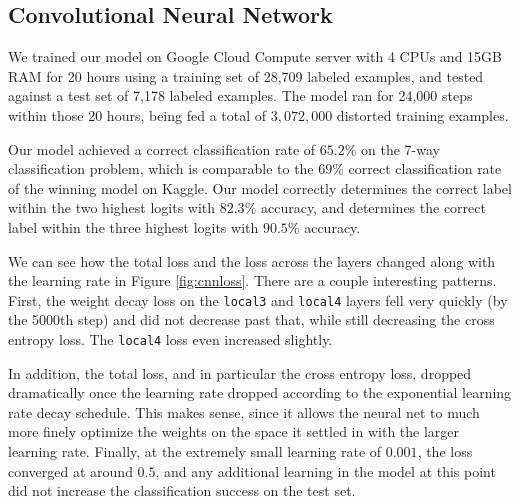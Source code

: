 \documentclass[11pt, twocolumn, twoside]{article}
\begin{document}
\subsection{Convolutional Neural Network}

We trained our model on Google Cloud Compute server with 4 CPUs and 15GB RAM for 20 hours using a training set of 28,709 labeled examples, and tested against a test set of 7,178 labeled examples. The model ran for 24,000 steps within those 20 hours, being fed a total of $3,072,000$ distorted training examples.

Our model achieved a correct classification rate of $65.2\%$ on the 7-way classification problem, which is comparable to the $69\%$ correct classification rate of the winning model on Kaggle. Our model correctly determines the correct label within the two highest logits with $82.3\%$ accuracy, and determines the correct label within the three highest logits with $90.5\%$ accuracy.

We can see how the total loss and the loss across the layers changed along with the learning rate in Figure \ref{fig:cnnloss}. There are a couple interesting patterns. First, the weight decay loss on the \texttt{local3} and \texttt{local4} layers fell very quickly (by the 5000th step) and did not decrease past that, while still decreasing the cross entropy loss. The \texttt{local4} loss even increased slightly. 

In addition, the total loss, and in particular the cross entropy loss, dropped dramatically once the learning rate dropped according to the exponential learning rate decay schedule. This makes sense, since it allows the neural net to much more finely optimize the weights on the space it settled in with the larger learning rate. Finally, at the extremely small learning rate of $0.001$, the loss converged at around $0.5$, and any additional learning in the model at this point did not increase the classification success on the test set.
\end{document}
